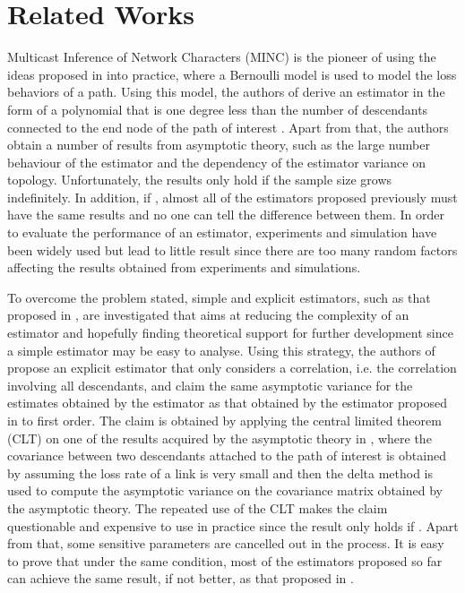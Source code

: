 \documentclass[10pt,onecolumn]{IEEEtran}
\begin{document}
\section{Related Works}\label{related work}

Multicast Inference of Network Characters (MINC) is the pioneer of using the ideas proposed in \cite{YV96} into practice, where a
Bernoulli model is used to model  the loss behaviors of a path. Using
this model, the authors of \cite{CDHT99} derive an estimator in the form of a polynomial that is one degree less than the number of descendants
connected to the end node of the path of interest \cite{CDHT99, CDMT99,CDMT99a}.  Apart from that, the authors obtain a number of results  from asymptotic theory, such as the large number behaviour of the estimator and the dependency of the estimator variance on topology. Unfortunately, the results only hold if the sample size  grows indefinitely. In addition, if ,  almost all of the estimators proposed previously must have the same results and no one can tell the difference between them.  In order to evaluate the performance of an estimator, experiments and simulation have been widely used but lead to little result since there are too many random factors affecting the results obtained from experiments and simulations.

To overcome the problem stated, simple and explicit estimators, such as that proposed in \cite{DHPT06}, are investigated that aims at reducing the complexity of an estimator and hopefully  finding theoretical support for further development since a simple estimator may be easy to analyse.
Using this strategy, the authors of \cite{DHPT06} propose an explicit estimator that only considers a correlation, i.e. the correlation involving all descendants, and claim the same asymptotic variance for the estimates obtained by the estimator as that obtained by the estimator proposed in \cite{CDHT99} to first
order. The claim is obtained by applying  the central limited theorem (CLT) on one of the results acquired by the asymptotic theory in \cite{CDHT99}, where  the covariance between two descendants attached to the path of interest is obtained by assuming the loss rate of a link is very small and then the delta method is used to compute the asymptotic variance on the covariance matrix obtained by the asymptotic theory. The repeated use of the CLT makes the claim questionable and expensive to use in practice since the result only holds if . Apart from that, some sensitive parameters are cancelled out in the process. It is easy to prove that under the same condition, most of the estimators proposed so far can achieve the same result, if not better,  as that proposed in \cite{DHPT06}.
\end{document}
